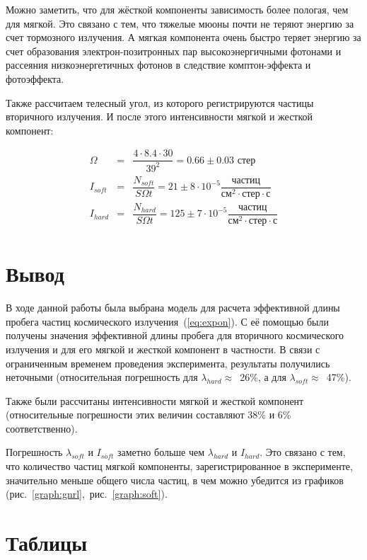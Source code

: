 \documentclass[reprint, nofootinbib, nobalancelastpage, 10pt]{revtex4-2}
\begin{document}
Можно заметить, что для жёсткой компоненты зависимость более пологая, чем для мягкой. Это
связано с тем, что тяжелые мюоны почти не теряют энергию за счет тормозного излучения. А
мягкая компонента очень быстро теряет энергию за счет образования электрон-позитронных пар
высокоэнергичными фотонами и рассеяния низкоэнергетичных фотонов в следствие комптон-эффекта
и фотоэффекта.

\newpage
Также рассчитаем телесный угол, из которого регистрируются частицы вторичного излучения.
И после этого интенсивности мягкой и жесткой компонент:


\begin{eqnarray*}
	\Omega &=& \dfrac{4 \cdot 8.4 \cdot 30}{39^2} = 0.66 \pm 0.03 \text{ стер} \\
	I_{soft} &=& \dfrac{N_{soft}}{S \Omega t} = 21 \pm 8 \cdot 10^{-5}
		\dfrac{\text{частиц}}{\text{см}^2 \cdot \text{стер} \cdot \text{с}} \\
	I_{hard} &=& \dfrac{N_{hard}}{S \Omega t} = 125 \pm 7 \cdot 10^{-5}
		\dfrac{\text{частиц}}{\text{см}^2 \cdot \text{стер} \cdot \text{с}} \\
\end{eqnarray*}


\section*{Вывод}

В ходе данной работы была выбрана модель для расчета эффективной длины пробега частиц
космического излучения~(\ref{eq:expon}). С её помощью были получены значения эффективной
длины пробега для вторичного космического излучения и для его мягкой и жесткой компонент
в частности. В связи с ограниченным временем проведения эксперимента, результаты
получились неточными (относительная погрешность для $\lambda_{hard} \approx$~26\%, а для
$\lambda_{soft} \approx$~47\%).

Также были рассчитаны интенсивности мягкой и жесткой компонент (относительные погрешности
этих величин составляют 38\% и 6\% соответственно).

Погрешность $\lambda_{soft}$ и $I_{soft}$ заметно больше чем $\lambda_{hard}$ и $I_{hard}$.
Это связано с тем, что количество частиц мягкой компоненты, зарегистрированное в
эксперименте, значительно меньше общего числа частиц, в чем можно убедится из графиков
(рис.~\ref{graph:gnrl},~рис.~\ref{graph:soft}).

\newpage
\appendix

\section*{Таблицы}



\end{document}
